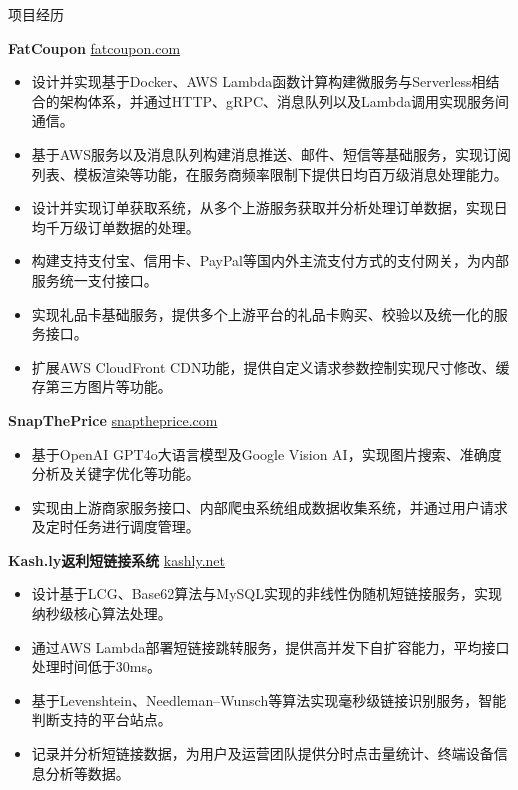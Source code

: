 \documentclass{resume} %
\begin{document}
\begin{rSection}{项目经历}
  \vspace{-1.25em}

  \item \textbf{FatCoupon} {} \hfill \href{https://fatcoupon.com}{fatcoupon.com}
  \begin{itemize}
    \itemsep -3pt {}
    \item 设计并实现基于Docker、AWS Lambda函数计算构建微服务与Serverless相结合的架构体系，并通过HTTP、gRPC、消息队列以及Lambda调用实现服务间通信。
    \item 基于AWS服务以及消息队列构建消息推送、邮件、短信等基础服务，实现订阅列表、模板渲染等功能，在服务商频率限制下提供日均百万级消息处理能力。
    \item 设计并实现订单获取系统，从多个上游服务获取并分析处理订单数据，实现日均千万级订单数据的处理。
    \item 构建支持支付宝、信用卡、PayPal等国内外主流支付方式的支付网关，为内部服务统一支付接口。
    \item 实现礼品卡基础服务，提供多个上游平台的礼品卡购买、校验以及统一化的服务接口。
    \item 扩展AWS CloudFront CDN功能，提供自定义请求参数控制实现尺寸修改、缓存第三方图片等功能。
  \end{itemize}

  \item \textbf{SnapThePrice} {} \hfill \href{https://snaptheprice.com}{snaptheprice.com}
  \begin{itemize}
    \itemsep -3pt {}
    \item 基于OpenAI GPT4o大语言模型及Google Vision AI，实现图片搜索、准确度分析及关键字优化等功能。
    \item 实现由上游商家服务接口、内部爬虫系统组成数据收集系统，并通过用户请求及定时任务进行调度管理。
  \end{itemize}

  \item \textbf{Kash.ly返利短链接系统} {} \hfill \href{https://kashly.net}{kashly.net}
  \begin{itemize}
    \itemsep -3pt {}
    \item 设计基于LCG、Base62算法与MySQL实现的非线性伪随机短链接服务，实现纳秒级核心算法处理。
    \item 通过AWS Lambda部署短链接跳转服务，提供高并发下自扩容能力，平均接口处理时间低于30ms。
    \item 基于Levenshtein、Needleman–Wunsch等算法实现毫秒级链接识别服务，智能判断支持的平台站点。
    \item 记录并分析短链接数据，为用户及运营团队提供分时点击量统计、终端设备信息分析等数据。
  \end{itemize}


\end{rSection}
\end{document}
